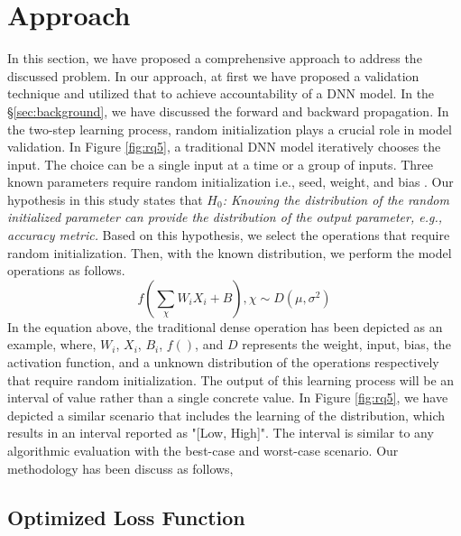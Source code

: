 \section{Approach}
\label{sec:approach}
In this section, we have proposed a comprehensive approach to address the discussed problem. In our approach, at first we have proposed a validation technique and utilized that to achieve accountability of a DNN model. In the \S\ref{sec:background}, we have discussed the forward and backward propagation. In the two-step learning process, random initialization plays a crucial role in model validation. In Figure \ref{fig:rq5}, a traditional DNN model iteratively chooses the input. The choice can be a single input at a time or a group of inputs. Three known parameters require random initialization i.e., seed, weight, and bias \cite{sutskever2013importance}. Our hypothesis in this study states that \emph{$H_0$: Knowing the distribution of the random initialized parameter can provide the distribution of the output parameter, e.g., accuracy metric.} Based on this hypothesis, we select the operations that require random initialization. Then, with the known distribution, we perform the model operations as follows.
\begin{equation}
f(\sum_{\chi}{W_iX_i+B}), \chi\sim D(\mu, \sigma^2)
\end{equation}
In the equation above, the traditional dense operation has been depicted as an example, where, $W_i$, $X_i$, $B_i$, $f()$, and $D$ represents the weight, input, bias, the activation function, and a unknown distribution of the operations respectively that require random initialization. The output of this learning process will be an interval of value rather than a single concrete value. In Figure \ref{fig:rq5}, we have depicted a similar scenario that includes the learning of the distribution, which results in an interval reported as "[Low, High]". The interval is similar to any algorithmic evaluation with the best-case and worst-case scenario. 
Our methodology has been discuss as follows,
\subsection{Optimized Loss Function}
